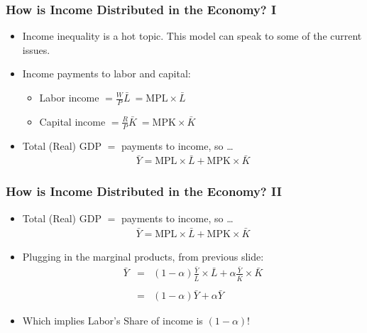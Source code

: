 \documentclass[handout]{beamer}
\begin{document}

\begin{frame}[t]
\frametitle{How is Income Distributed in the Economy? I}
\begin{itemize}
\item Income inequality is a hot topic. This model can speak to some of the current issues.
\bigskip
\item Income payments to labor and capital:
\begin{itemize}
\medskip
\item Labor income $= \frac{W}{P}\bar L \ = \mbox{MPL}\times \bar L$
\medskip
\item Capital income $= \frac{R}{P}\bar K \ = \mbox{MPK}\times \bar K$
\end{itemize}
\bigskip
\item Total (Real) GDP $=$ payments to income, so \ldots
\begin{eqnarray*}
\bar Y = \mbox{MPL}\times \bar L + \mbox{MPK}\times \bar K
\end{eqnarray*}
\end{itemize}
\end{frame}


\begin{frame}[t]
\frametitle{How is Income Distributed in the Economy? II}
\begin{itemize}
\item Total (Real) GDP $=$ payments to income, so \ldots
\begin{eqnarray*}
\bar Y = \mbox{MPL}\times \bar L + \mbox{MPK}\times \bar K
\end{eqnarray*}
\bigskip
\item Plugging in the marginal products, from previous slide:
\begin{eqnarray*}
\bar Y& =& (1-\alpha)\frac{\bar Y}{\bar L}\times \bar L + \alpha \frac{\bar Y}{\bar K}\times \bar K \\
\\
& =& (1-\alpha)\bar Y + \alpha \bar Y
\end{eqnarray*}
\item Which implies Labor's Share of income is $(1-\alpha)$!
\end{itemize}
\end{frame}
\end{document}
